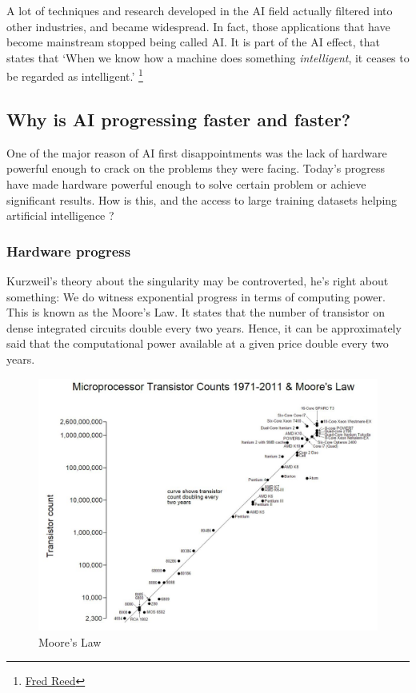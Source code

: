 \documentclass[12pt]{article}
\begin{document}
A lot of techniques and research developed in the AI field actually filtered
into  other industries, and became widespread. In fact, those applications that
have become  mainstream stopped being called AI. It is part of the AI effect,
that states that \lq When we know how a machine does something {\em
intelligent}, it ceases to be regarded as intelligent.\rq
\footnote{\href{http://www.washingtontimes.com/news/2006/apr/13/20060413-105217-7645r/}
{Fred Reed}}


\pagebreak

\subsection{Why is AI progressing faster and faster?}

One of the major reason of AI first disappointments was the lack of hardware
powerful  enough to crack on the problems they were facing. Today's progress
have made hardware powerful enough to solve certain problem or achieve
significant results. How is this, and the  access to large training datasets
helping artificial intelligence ?

\subsubsection{Hardware progress}

Kurzweil's theory about the singularity may be controverted, he's right about
something: We do witness exponential progress in terms of computing power. This
is known as the Moore's Law. It states that the number of transistor on dense
integrated circuits double every two years. Hence, it can be approximately said
that the computational power available at a given price double every two years.

\begin{figure}[ht]
    \centering
    \includegraphics[width=\textwidth]{moore}
    \caption{Moore's Law}
    \label{fig:moore}
\end{figure}
\end{document}
